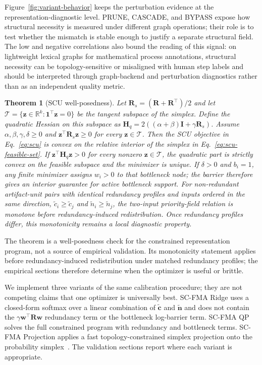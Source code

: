 \documentclass[a4paper,fleqn]{cas-sc}
\newtheorem{theorem}{Theorem}[section]
\begin{document}
Figure~\ref{fig:variant-behavior} keeps the perturbation evidence at the representation-diagnostic level. PRUNE, CASCADE, and BYPASS expose how structural necessity is measured under different graph operations; their role is to test whether the mismatch is stable enough to justify a separate structural field. The low and negative correlations also bound the reading of this signal: on lightweight lexical graphs for mathematical process annotations, structural necessity can be topology-sensitive or misaligned with human step labels and should be interpreted through graph-backend and perturbation diagnostics rather than as an independent quality metric.

\begin{theorem}[SCU well-posedness]
\label{thm:scu-well-posedness}
Let $\mathbf{R}_{s}=(\mathbf{R}+\mathbf{R}^{\top})/2$ and let $\mathcal{T}=\{\mathbf{z}\in\mathbb{R}^{k}:\mathbf{1}^{\top}\mathbf{z}=0\}$ be the tangent subspace of the simplex. Define the quadratic Hessian on this subspace as $\mathbf{H}_{q}=2((\alpha+\beta)\mathbf{I}+\gamma\mathbf{R}_{s})$. Assume $\alpha,\beta,\gamma,\delta \ge 0$ and $\mathbf{z}^{\top}\mathbf{R}_{s}\mathbf{z}\ge 0$ for every $\mathbf{z}\in\mathcal{T}$. Then the SCU objective in Eq.~\ref{eq:scu} is convex on the relative interior of the simplex in Eq.~\ref{eq:scu-feasible-set}. If $\mathbf{z}^{\top}\mathbf{H}_{q}\mathbf{z}>0$ for every nonzero $\mathbf{z}\in\mathcal{T}$, the quadratic part is strictly convex on the feasible subspace and the minimizer is unique. If $\delta>0$ and $b_i=1$, any finite minimizer assigns $w_i>0$ to that bottleneck node; the barrier therefore gives an interior guarantee for active bottleneck support. For non-redundant artifact-unit pairs with identical redundancy profiles and inputs ordered in the same direction, $\tilde c_i\ge \tilde c_j$ and $\tilde n_i\ge \tilde n_j$, the two-input priority-field relation is monotone before redundancy-induced redistribution. Once redundancy profiles differ, this monotonicity remains a local diagnostic property.
\end{theorem}

The theorem is a well-posedness check for the constrained representation program, not a source of empirical validation. Its monotonicity statement applies before redundancy-induced redistribution under matched redundancy profiles; the empirical sections therefore determine when the optimizer is useful or brittle.

We implement three variants of the same calibration procedure; they are not competing claims that one optimizer is universally best. SC-FMA Ridge uses a closed-form softmax over a linear combination of $\tilde{\mathbf{c}}$ and $\tilde{\mathbf{n}}$ and does not contain the $\gamma\mathbf{w}^{\top}\mathbf{R}\mathbf{w}$ redundancy term or the bottleneck log-barrier term. SC-FMA QP solves the full constrained program with redundancy and bottleneck terms. SC-FMA Projection applies a fast topology-constrained simplex projection onto the probability simplex~\cite{wang2013projection}. The validation sections report where each variant is appropriate.
\end{document}
